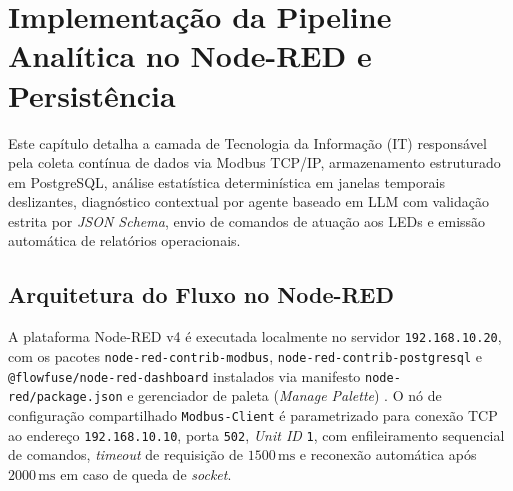 
\chapter{Implementação da Pipeline Analítica no Node-RED e Persistência}
\label{cap:implementacao_nodered}

Este capítulo detalha a camada de Tecnologia da Informação (IT) responsável pela coleta contínua de dados via Modbus TCP/IP, armazenamento estruturado em PostgreSQL, análise estatística determinística em janelas temporais deslizantes, diagnóstico contextual por agente baseado em LLM com validação estrita por \textit{JSON Schema}, envio de comandos de atuação aos LEDs e emissão automática de relatórios operacionais.

\section{Arquitetura do Fluxo no Node-RED}
\label{sec:nodered_flow}

A plataforma Node-RED v4 é executada localmente no servidor \texttt{192.168.10.20}, com os pacotes \texttt{node-red-\allowbreak contrib-\allowbreak modbus}, \texttt{node-red-\allowbreak contrib-\allowbreak postgresql} e \texttt{@flowfuse/\allowbreak node-red-\allowbreak dashboard} instalados via manifesto \texttt{node-red/\allowbreak package.json} e gerenciador de paleta (\textit{Manage Palette}) \cite{nodered_docs, nodered_contrib_modbus}. O nó de configuração compartilhado \texttt{Modbus-Client} é parametrizado para conexão TCP ao endereço \texttt{192.168.10.10}, porta \texttt{502}, \textit{Unit ID} \texttt{1}, com enfileiramento sequencial de comandos, \textit{timeout} de requisição de $1500\,\text{ms}$ e reconexão automática após $2000\,\text{ms}$ em caso de queda de \textit{socket}.

